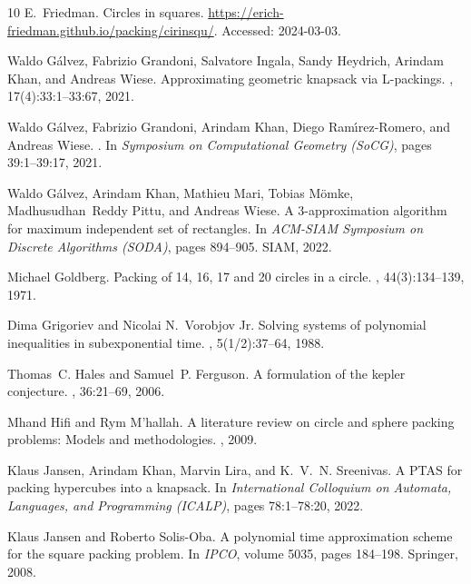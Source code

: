 \documentclass[10pt,a4paper]{article}
\theoremstyle{plain}
\theoremstyle{plain}
\theoremstyle{plain}
\theoremstyle{definition}
\begin{document}
{\begin{thebibliography}{10}
E.~Friedman.
\newblock Circles in squares.
\newblock \url{https://erich-friedman.github.io/packing/cirinsqu/}.
\newblock Accessed: 2024-03-03.

Waldo G{\'{a}}lvez, Fabrizio Grandoni, Salvatore Ingala, Sandy Heydrich, Arindam Khan, and Andreas Wiese.
\newblock Approximating geometric knapsack via {L}-packings.
, 17(4):33:1--33:67, 2021.

Waldo G\'{a}lvez, Fabrizio Grandoni, Arindam Khan, Diego Ram{\'\i}rez-Romero, and Andreas Wiese.
.
\newblock In {\em Symposium on Computational Geometry (SoCG)}, pages 39:1--39:17, 2021.

Waldo G{\'{a}}lvez, Arindam Khan, Mathieu Mari, Tobias M{\"{o}}mke, Madhusudhan~Reddy Pittu, and Andreas Wiese.
\newblock A 3-approximation algorithm for maximum independent set of rectangles.
\newblock In {\em ACM-SIAM Symposium on Discrete Algorithms (SODA)}, pages 894--905. {SIAM}, 2022.

Michael Goldberg.
\newblock Packing of 14, 16, 17 and 20 circles in a circle.
, 44(3):134--139, 1971.

Dima Grigoriev and Nicolai N.~Vorobjov Jr.
\newblock Solving systems of polynomial inequalities in subexponential time.
, 5(1/2):37--64, 1988.

Thomas~C. Hales and Samuel~P. Ferguson.
\newblock A formulation of the kepler conjecture.
, 36:21--69, 2006.

Mhand Hifi and Rym M'hallah.
\newblock A literature review on circle and sphere packing problems: Models and methodologies.
, 2009.

Klaus Jansen, Arindam Khan, Marvin Lira, and K.~V.~N. Sreenivas.
\newblock A {PTAS} for packing hypercubes into a knapsack.
\newblock In {\em International Colloquium on Automata, Languages, and Programming (ICALP)}, pages 78:1--78:20, 2022.

Klaus Jansen and Roberto Solis{-}Oba.
\newblock A polynomial time approximation scheme for the square packing problem.
\newblock In {\em IPCO}, volume 5035, pages 184--198. Springer, 2008.


\end{thebibliography}}
\end{document}

